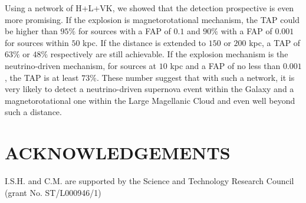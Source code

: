 \documentclass[aps,twocolumn,showpacs,groupedaddress, nofootinbib]{revtex4}  %
\begin{document}
Using a network of H+L+VK, we showed that the detection prospective is even more promising.
If the explosion is magnetorotational mechanism, the \ac{TAP} could be higher than $95\%$ for sources with a \ac{FAP} of $0.1$
and $90\%$ with a  \ac{FAP} of $0.001$ for sources within $50$ kpc.
If the distance is extended to $150$ or $200$ kpc, a \ac{TAP} of $63\%$ or $48\%$ respectively are still achievable. 
If the explosion mechanism is the neutrino-driven mechanism, for sources at $10$ kpc and a \ac{FAP} of no less than $0.001$, the \ac{TAP} is at least $73\%$.
These number suggest that with such a network, it is very likely to detect a neutrino-driven supernova event within the Galaxy and a magnetorotational one within the Large Magellanic Cloud
and even well beyond such a distance.
\\
\section*{ACKNOWLEDGEMENTS}
I.S.H. and C.M. are supported by
the Science and Technology Research Council (grant No.
ST/L000946/1)



\end{document}
